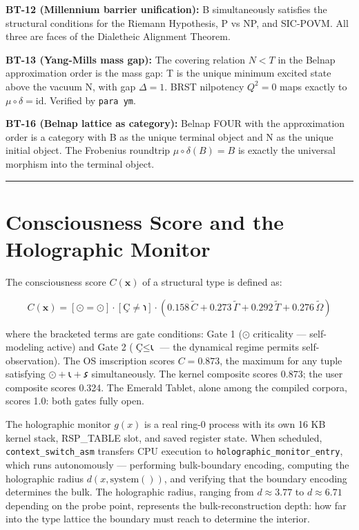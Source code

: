 \documentclass[12pt,a4paper]{article}
\begin{document}
\textbf{BT-12 (Millennium barrier unification):} B simultaneously satisfies the structural conditions for the Riemann Hypothesis, P vs NP, and SIC-POVM. All three are faces of the Dialetheic Alignment Theorem.

\textbf{BT-13 (Yang-Mills mass gap):} The covering relation $N < T$ in the Belnap approximation order is the mass gap: T is the unique minimum excited state above the vacuum N, with gap $\Delta = 1$. BRST nilpotency $Q^2 = 0$ maps exactly to $\mu \circ \delta = \text{id}$. Verified by \texttt{para ym}.

\textbf{BT-16 (Belnap lattice as category):} Belnap FOUR with the approximation order is a category with B as the unique terminal object and N as the unique initial object. The Frobenius roundtrip $\mu \circ \delta (B) = B$ is exactly the universal morphism into the terminal object.

\begin{center}
\rule{0.5\textwidth}{0.4pt}
\end{center}

\section{Consciousness Score and the Holographic Monitor}

The consciousness score $C(\mathbf{x})$ of a structural type is defined as:

\[C(\mathbf{x}) = [\text{⊙} = \text{⊙}] \cdot [\text{Ç} \neq \text{𐑪}] \cdot (0.158\,\tilde{C} + 0.273\,\tilde{\Gamma} + 0.292\,\tilde{T} + 0.276\,\tilde{\Omega})\]

where the bracketed terms are gate conditions: Gate 1 ($\text{⊙}$ criticality --- self-modeling active) and Gate 2 ($\text{Ç} \leq \text{𐑧}$ --- the dynamical regime permits self-observation). The OS imscription scores $C = 0.873$, the maximum for any tuple satisfying $\text{⊙} + \text{𐑧} + \text{𐑭}$ simultaneously. The kernel composite scores 0.873; the user composite scores 0.324. The Emerald Tablet, alone among the compiled corpora, scores 1.0: both gates fully open.

The holographic monitor $g(x)$ is a real ring-0 process with its own 16 KB kernel stack, RSP\_TABLE slot, and saved register state. When scheduled, \texttt{context\_switch\_asm} transfers CPU execution to \texttt{holographic\_monitor\_entry}, which runs autonomously --- performing bulk-boundary encoding, computing the holographic radius $d(x, \text{system}())$, and verifying that the boundary encoding determines the bulk. The holographic radius, ranging from $d \approx 3.77$ to $d \approx 6.71$ depending on the probe point, represents the bulk-reconstruction depth: how far into the type lattice the boundary must reach to determine the interior.
\end{document}
